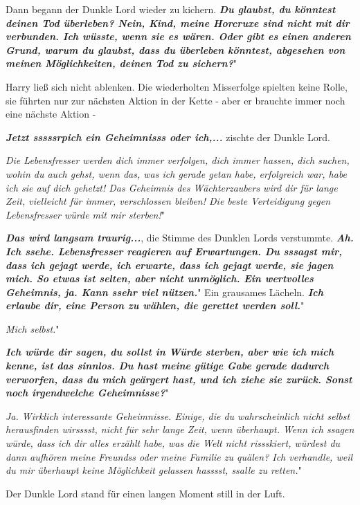 Dann begann der Dunkle Lord wieder zu kichern. \glqq \textbf{\emph{Du glaubst,
du könntest deinen Tod überleben? Nein, Kind, meine Horcruxe sind nicht mit dir
verbunden. Ich wüsste, wenn sie es wären. Oder gibt es einen anderen Grund,
warum du glaubst, dass du überleben könntest, abgesehen von meinen
Möglichkeiten, deinen Tod zu sichern?}}"

Harry ließ sich nicht ablenken. Die wiederholten Misserfolge spielten keine
Rolle, sie führten nur zur nächsten Aktion in der Kette - aber er brauchte immer
noch eine nächste Aktion -

\glqq \textbf{\emph{Jetzt sssssrpich ein Geheimnisss oder ich,...}}\grqq{}
zischte der Dunkle Lord.

\glqq \emph{Die Lebensfresser werden dich immer verfolgen, dich immer hassen,
dich suchen, wohin du auch gehst, wenn das, was ich gerade getan habe,
erfolgreich war, habe ich sie auf dich gehetzt! Das Geheimnis des Wächterzaubers
wird dir für lange Zeit, vielleicht für immer, verschlossen bleiben! Die beste
Verteidigung gegen Lebensfresser würde mit mir sterben!}"

\glqq \textbf{\emph{Das wird langsam traurig...}}\grqq{}, die Stimme des Dunklen
Lords verstummte. \glqq \textbf{\emph{Ah. Ich ssehe. Lebensfresser reagieren auf
Erwartungen. Du sssagst mir, dass ich gejagt werde, ich erwarte, dass ich gejagt
werde, sie jagen mich. So etwas ist selten, aber nicht unmöglich. Ein wertvolles
Geheimnis, ja. Kann ssehr viel nützen.}}" Ein grausames Lächeln. \glqq
\textbf{\emph{Ich erlaube dir, eine Person zu wählen, die gerettet werden
soll.}}"

\glqq \emph{Mich selbst.}"

\glqq \textbf{\emph{Ich würde dir sagen, du sollst in Würde sterben, aber wie
ich mich kenne, ist das sinnlos. Du hast meine gütige Gabe gerade dadurch
verworfen, dass du mich geärgert hast, und ich ziehe sie zurück. Sonst noch
irgendwelche Geheimnisse?}}"

\glqq \emph{Ja. Wirklich interessante Geheimnisse. Einige, die du wahrscheinlich
nicht selbst herausfinden wirsssst, nicht für sehr lange Zeit, wenn überhaupt.
Wenn ich ssagen würde, dass ich dir alles erzählt habe, was die Welt nicht
rissskiert, würdest du dann aufhören meine Freundss oder meine Familie zu
quälen? Ich verhandle, weil du mir überhaupt keine Möglichkeit gelassen hasssst,
ssalle zu retten.}"

Der Dunkle Lord stand für einen langen Moment still in der Luft.

